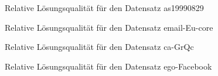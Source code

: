 \begin{figure}[t]
    \centering
    
    \caption{Relative Lösungsqualität für den Datensatz as19990829\label{fig:as}}
\end{figure}


\begin{figure}
    \centering
    
    \caption{Relative Lösungsqualität für den Datensatz email-Eu-core\label{fig:email}}
\end{figure}

\begin{figure}
    \centering
    
    \caption{Relative Lösungsqualität für den Datensatz ca-GrQc\label{fig:cagrqc}}
\end{figure}

\begin{figure}
    \centering
    
    \caption{Relative Lösungsqualität für den Datensatz ego-Facebook\label{fig:facebook}}
\end{figure}

